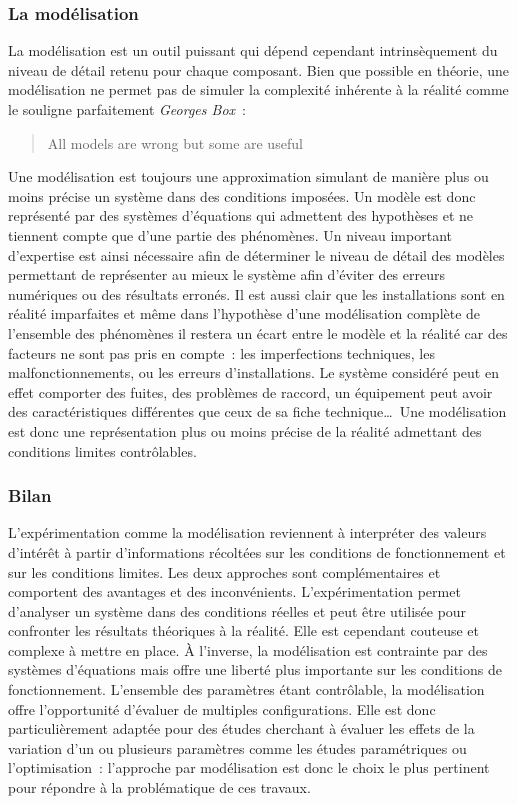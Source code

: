 \subsubsection{La modélisation} %
\label{ssub:la_modelisation}
La modélisation est un outil puissant qui dépend cependant intrinsèquement du niveau de
détail retenu pour chaque composant. Bien que possible en théorie, une modélisation ne
permet pas de simuler la complexité inhérente à la réalité comme le souligne parfaitement
\textit{Georges Box}~:
\blockquote{All models are wrong but some are useful}
Une modélisation est toujours une approximation simulant de manière plus ou moins précise
un système dans des conditions imposées. Un modèle est donc représenté par des systèmes
d’équations qui admettent des hypothèses et ne tiennent compte que d’une partie des
phénomènes. Un niveau important d’expertise est ainsi nécessaire afin de déterminer le
niveau de détail des modèles permettant de représenter au mieux le système afin d’éviter
des erreurs numériques ou des résultats erronés. Il est aussi clair que les installations
sont en réalité imparfaites et même dans l’hypothèse d’une modélisation complète de
l’ensemble des phénomènes il restera un écart entre le modèle et la réalité car des
facteurs ne sont pas pris en compte~: les imperfections techniques, les
malfonctionnements, ou les erreurs d’installations. Le système considéré peut en effet
comporter des fuites, des problèmes de raccord, un équipement peut avoir des
caractéristiques différentes que ceux de sa fiche technique\dots\
Une modélisation est donc une représentation plus ou moins précise de la réalité
admettant des conditions limites contrôlables.


\subsubsection{Bilan} %
\label{ssub:bilan_modelisation}
L’expérimentation comme la modélisation reviennent à interpréter des valeurs d’intérêt à
partir d’informations récoltées sur les conditions de fonctionnement et sur les conditions
limites. Les deux approches sont complémentaires et comportent des avantages et des
inconvénients. L’expérimentation permet d’analyser un système dans des conditions réelles
et peut être utilisée pour confronter les résultats théoriques à la réalité. Elle est
cependant couteuse et complexe à mettre en place. À l’inverse, la modélisation est
contrainte par des systèmes d’équations mais offre une liberté plus importante sur les
conditions de fonctionnement. L’ensemble des paramètres étant contrôlable, la
modélisation offre l’opportunité d’évaluer de multiples configurations. Elle est donc
particulièrement adaptée pour des études cherchant à évaluer les effets de la variation
d’un ou plusieurs paramètres comme les études paramétriques ou l’optimisation~:
l’approche par modélisation est donc le choix le plus pertinent pour répondre à la
problématique de ces travaux.


